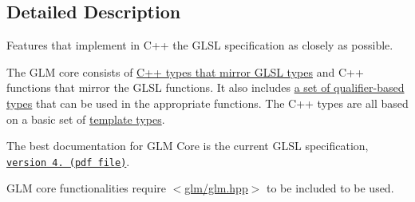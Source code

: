 \subsection{Detailed Description}
Features that implement in C++ the G\+L\+SL specification as closely as possible. 

The G\+LM core consists of \hyperlink{group__core__types}{C++ types that mirror G\+L\+SL types} and C++ functions that mirror the G\+L\+SL functions. It also includes \hyperlink{group__core__precision}{a set of qualifier-\/based types} that can be used in the appropriate functions. The C++ types are all based on a basic set of \hyperlink{group__core__template}{template types}.

The best documentation for G\+LM Core is the current G\+L\+SL specification, \href{http://www.opengl.org/registry/doc/GLSLangSpec.4.20.8.clean.pdf}{\tt version 4. (pdf file)}.

G\+LM core functionalities require $<$\hyperlink{glm_8hpp}{glm/glm.\+hpp}$>$ to be included to be used. 